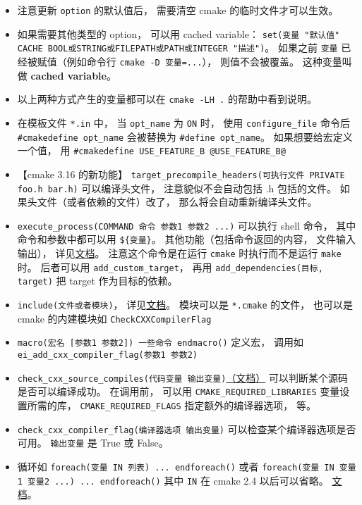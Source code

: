 \begin{itemize}
\item 注意更新 \verb|option| 的默认值后， 需要清空 cmake 的临时文件才可以生效。
\item 如果需要其他类型的 option， 可以用 cached variable： \verb|set(变量 "默认值" CACHE BOOL或STRING或FILEPATH或PATH或INTEGER "描述")|。 如果之前 \verb|变量| 已经被赋值（例如命令行 \verb|cmake -D 变量=...|）， 则值不会被覆盖。 这种变量叫做 \textbf{cached variable}。
\item 以上两种方式产生的变量都可以在 \verb|cmake -LH .| 的帮助中看到说明。
\item 在模板文件 \verb`*.in` 中， 当 \verb`opt_name` 为 \verb`ON` 时， 使用 \verb|configure_file| 命令后 \verb`#cmakedefine opt_name` 会被替换为 \verb`#define opt_name`。 如果想要给宏定义一个值， 用 \verb`#cmakedefine USE_FEATURE_B @USE_FEATURE_B@`
\item 【cmake 3.16 的新功能】 \verb|target_precompile_headers(可执行文件 PRIVATE foo.h bar.h)| 可以编译头文件， 注意貌似不会自动包括 .h 包括的文件。 如果头文件（或者依赖的文件）改了， 那么将会自动重新编译头文件。
\item \verb|execute_process(COMMAND 命令 参数1 参数2 ...)| 可以执行 shell 命令， 其中命令和参数中都可以用 \verb|${变量}|。 其他功能（包括命令返回的内容， 文件输入输出）， 详见\href{https://cmake.org/cmake/help/latest/command/execute_process.html}{文档}。 注意这个命令是在运行 \verb|cmake| 时执行而不是运行 \verb|make| 时。 后者可以用 \verb|add_custom_target|， 再用 \verb|add_dependencies(目标, target)| 把 target 作为目标的依赖。
\item \verb|include(文件或者模块)|， 详见\href{https://cmake.org/cmake/help/latest/command/include.html}{文档}。 模块可以是 \verb|*.cmake| 的文件， 也可以是 cmake 的内建模块如 \verb|CheckCXXCompilerFlag|
\item \verb|macro(宏名 [参数1 参数2]) 一些命令 endmacro()| 定义宏， 调用如 \verb|ei_add_cxx_compiler_flag(参数1 参数2)|
\item \verb|check_cxx_source_compiles(代码变量 输出变量)|\href{https://cmake.org/cmake/help/latest/module/CheckCXXSourceCompiles.html}{（文档）} 可以判断某个源码是否可以编译成功。 在调用前， 可以用 \verb|CMAKE_REQUIRED_LIBRARIES| 变量设置所需的库， \verb|CMAKE_REQUIRED_FLAGS| 指定额外的编译器选项， 等。
\item \verb|check_cxx_compiler_flag(编译器选项 输出变量)| 可以检查某个编译器选项是否可用。 \verb|输出变量| 是 True 或 False。
\item 循环如 \verb|foreach(变量 IN 列表) ... endforeach()| 或者 \verb|foreach(变量 IN 变量1 变量2 ...) ... endforeach()| 其中 \verb|IN| 在 cmake 2.4 以后可以省略。 \href{https://cmake.org/cmake/help/latest/command/foreach.html}{文档}。

\end{itemize}
